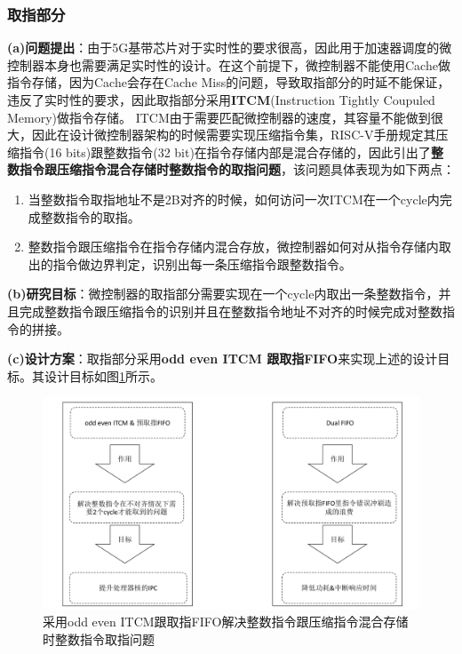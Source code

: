 \documentclass[a4paper, 12pt]{article}
\begin{document}
\subsubsection{取指部分}
\textbf{(a)问题提出}：由于5G基带芯片对于实时性的要求很高，因此用于加速器调度的微控制器本身也需要满足实时性的设计。在这个前提下，微控制器不能使用Cache做指令存储，因为Cache会存在Cache Miss的问题，导致取指部分的时延不能保证，违反了实时性的要求，因此取指部分采用\textbf{ITCM}(Instruction Tightly Coupuled Memory)做指令存储。
ITCM由于需要匹配微控制器的速度，其容量不能做到很大，因此在设计微控制器架构的时候需要实现压缩指令集，RISC-V手册规定其压缩指令(16 bits)跟整数指令(32 bit)在指令存储内部是混合存储的，因此引出了\textbf{整数指令跟压缩指令混合存储时整数指令的取指问题}，该问题具体表现为如下两点：
\begin{enumerate}
  \item 当整数指令取指地址不是2B对齐的时候，如何访问一次ITCM在一个cycle内完成整数指令的取指。
  \item 整数指令跟压缩指令在指令存储内混合存放，微控制器如何对从指令存储内取出的指令做边界判定，识别出每一条压缩指令跟整数指令。
\end{enumerate}

\textbf{(b)研究目标}：微控制器的取指部分需要实现在一个cycle内取出一条整数指令，并且完成整数指令跟压缩指令的识别并且在整数指令地址不对齐的时候完成对整数指令的拼接。

\textbf{(c)设计方案}：取指部分采用\textbf{odd even ITCM 跟取指FIFO}来实现上述的设计目标。其设计目标如图\ref{fig:if_design_features}所示。
\begin{figure}
  \centering
  \includegraphics[width=0.8\linewidth]{./images/if_design_features.pdf}
  \caption{采用odd even ITCM跟取指FIFO解决整数指令跟压缩指令混合存储时整数指令取指问题}
  \label{fig:if_design_features}
\end{figure}
\end{document}
